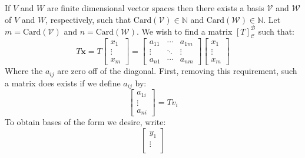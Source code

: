 \documentclass[crop=false,class=article]{standalone}                       %
\begin{document}
        \begin{solution}
            If $V$ and $W$ are finite dimensional vector spaces then
            there exists a basis $\mathcal{V}$ and $\mathcal{W}$ of $V$ and
            $W$, respectively, such that
            $\textrm{Card}(\mathcal{V})\in\mathbb{N}$ and
            $\textrm{Card}(\mathcal{W})\in\mathbb{N}$. Let
            $m=\textrm{Card}(\mathcal{V})$ and
            $n=\textrm{Card}(\mathcal{W})$.
            We wish to find a matrix $[T]_{\mathscr{C}}^{\mathscr{B}}$ such
            that:
            \begin{equation}
                T\mathbf{x}=T
                \begin{bmatrix}
                    x_{1}\\
                    \vdots\\
                    x_{m}
                \end{bmatrix}=
                \begin{bmatrix}
                    a_{11}&\cdots&a_{1m}\\
                    \vdots&\ddots&\vdots\\
                    a_{n1}&\cdots&a_{nm}
                \end{bmatrix}
                \begin{bmatrix}
                    x_{1}\\
                    \vdots\\
                    x_{m}
                \end{bmatrix}
            \end{equation}
            Where the $a_{ij}$ are zero off of the diagonal. First, removing
            this requirement, such a matrix does exists if we define
            $a_{ij}$ by:
            \begin{equation}
                \begin{bmatrix}
                    a_{1i}\\
                    \vdots\\
                    a_{ni}
                \end{bmatrix}=Tv_{i}
            \end{equation}
            To obtain bases of the form we desire, write:
            \begin{equation}
                \begin{bmatrix}
                    y_{1}\\
                    \vdots\\

\end{bmatrix}
\end{equation}
\end{solution}
\end{document}

